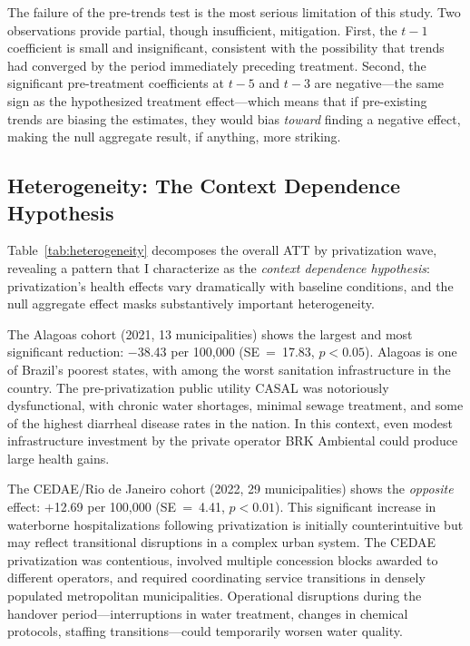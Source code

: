 \documentclass[12pt]{article}
\begin{document}
The failure of the pre-trends test is the most serious limitation of this study. Two observations provide partial, though insufficient, mitigation. First, the $t-1$ coefficient is small and insignificant, consistent with the possibility that trends had converged by the period immediately preceding treatment. Second, the significant pre-treatment coefficients at $t-5$ and $t-3$ are negative---the same sign as the hypothesized treatment effect---which means that if pre-existing trends are biasing the estimates, they would bias \textit{toward} finding a negative effect, making the null aggregate result, if anything, more striking.

\subsection{Heterogeneity: The Context Dependence Hypothesis}



Table~\ref{tab:heterogeneity} decomposes the overall ATT by privatization wave, revealing a pattern that I characterize as the \textit{context dependence hypothesis}: privatization's health effects vary dramatically with baseline conditions, and the null aggregate effect masks substantively important heterogeneity.

The Alagoas cohort (2021, 13 municipalities) shows the largest and most significant reduction: $-$38.43 per 100,000 (SE~=~17.83, $p<0.05$). Alagoas is one of Brazil's poorest states, with among the worst sanitation infrastructure in the country. The pre-privatization public utility CASAL was notoriously dysfunctional, with chronic water shortages, minimal sewage treatment, and some of the highest diarrheal disease rates in the nation. In this context, even modest infrastructure investment by the private operator BRK Ambiental could produce large health gains.

The CEDAE/Rio de Janeiro cohort (2022, 29 municipalities) shows the \textit{opposite} effect: $+$12.69 per 100,000 (SE~=~4.41, $p<0.01$). This significant increase in waterborne hospitalizations following privatization is initially counterintuitive but may reflect transitional disruptions in a complex urban system. The CEDAE privatization was contentious, involved multiple concession blocks awarded to different operators, and required coordinating service transitions in densely populated metropolitan municipalities. Operational disruptions during the handover period---interruptions in water treatment, changes in chemical protocols, staffing transitions---could temporarily worsen water quality.
\end{document}
